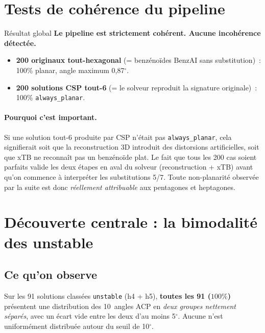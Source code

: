 \documentclass[11pt,a4paper]{article}
\begin{document}
\section{Tests de cohérence du pipeline}

\begin{encadre}{Résultat global}
\textbf{Le pipeline est strictement cohérent. Aucune incohérence détectée.}
\begin{itemize}[leftmargin=2em,itemsep=0.2em]
  \item \textbf{200 originaux tout-hexagonal} (= benzénoïdes BenzAI sans substitution)~: 100\% planar, angle maximum 0,87$^\circ$.
  \item \textbf{200 solutions CSP tout-6} (= le solveur reproduit la signature originale)~: 100\% \texttt{always\_planar}.
\end{itemize}
\end{encadre}

\paragraph{Pourquoi c'est important.}
Si une solution tout-6 produite par CSP n'était pas \texttt{always\_planar}, cela signifierait soit que la reconstruction 3D introduit des distorsions artificielles, soit que xTB ne reconnaît pas un benzénoïde plat. Le fait que tous les 200 cas soient parfaits valide les deux étapes en aval du solveur (reconstruction + xTB) avant qu'on commence à interpréter les substitutions 5/7. Toute non-planarité observée par la suite est donc \emph{réellement attribuable} aux pentagones et heptagones.

\section{Découverte centrale : la bimodalité des unstable}

\subsection{Ce qu'on observe}

Sur les 91 solutions classées \texttt{unstable} (h4 + h5), \textbf{toutes les 91 ($100\%$)} présentent une distribution des 10~angles ACP en \emph{deux groupes nettement séparés}, avec un écart vide entre les deux d'au moins 5$^\circ$. Aucune n'est uniformément distribuée autour du seuil de 10$^\circ$.
\end{document}
